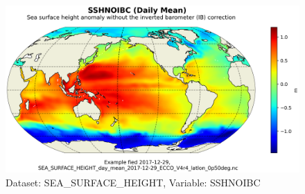 \begin{figure}[H]
\centering
\includegraphics[scale=0.55]{../images/plots/latlon_plots/Sea_Surface_Height/SSHNOIBC.png}
\caption{Dataset: SEA\_SURFACE\_HEIGHT, Variable: SSHNOIBC}
\label{tab:table-SEA_SURFACE_HEIGHT_SSHNOIBC-Plot}
\end{figure}